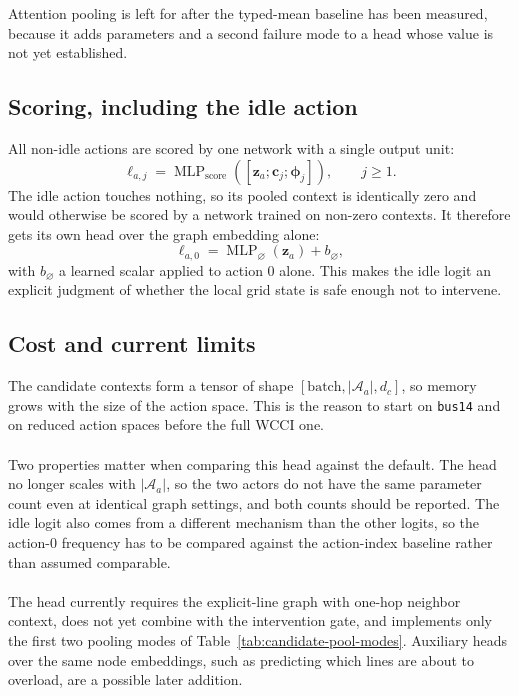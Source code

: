 \noindent Attention pooling is left for after the typed-mean baseline has been measured,
because it adds parameters and a second failure mode to a head whose value is
not yet established.

\subsection{Scoring, including the idle action}
\label{subsec:candidate-scorer}

All non-idle actions are scored by one network with a single output unit:
\begin{equation}
  \ell_{a,j} =
  \operatorname{MLP}_{\mathrm{score}}
  \left(
    \left[\mathbf{z}_a;\mathbf{c}_j;\boldsymbol{\phi}_j\right]
  \right),
  \qquad j\geq 1.
  \label{eq:candidate-shared-scorer}
\end{equation}
The idle action touches nothing, so its pooled context is identically zero and
would otherwise be scored by a network trained on non-zero contexts. It
therefore gets its own head over the graph embedding alone:
\begin{equation}
  \ell_{a,0} =
  \operatorname{MLP}_{\varnothing}(\mathbf{z}_a) + b_{\varnothing},
  \label{eq:candidate-do-nothing-head}
\end{equation}
with $b_{\varnothing}$ a learned scalar applied to action $0$ alone. This makes
the idle logit an explicit judgment of whether the local grid state is safe
enough not to intervene.

{\color{blue}
\subsection{Cost and current limits}
\label{subsec:candidate-configuration}

The candidate contexts form a tensor of shape
$\left[\text{batch},|\mathcal{A}_a|,d_c\right]$, so memory grows with the size
of the action space. This is the reason to start on \texttt{bus14} and on
reduced action spaces before the full WCCI one.
\\
\\
Two properties matter when comparing this head against the default. The head no
longer scales with $|\mathcal{A}_a|$, so the two actors do not have the same
parameter count even at identical graph settings, and both counts should be
reported. The idle logit also comes from a different mechanism than the other
logits, so the action-$0$ frequency has to be compared against the action-index
baseline rather than assumed comparable.
\\
\\
The head currently requires the explicit-line graph with one-hop neighbor
context, does not yet combine with the intervention gate, and implements only
the first two pooling modes of Table~\ref{tab:candidate-pool-modes}. Auxiliary
heads over the same node embeddings, such as predicting which lines are about to
overload, are a possible later addition.
}
